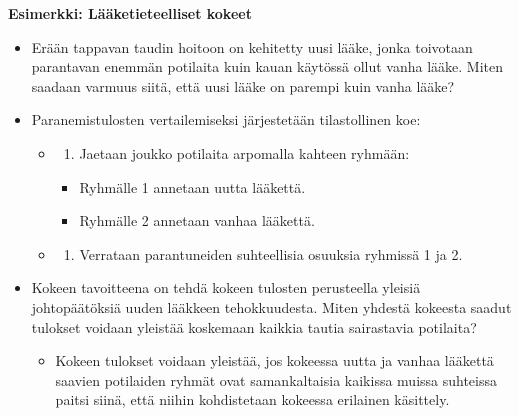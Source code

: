 \documentclass[
]{book}
\providecommand{\tightlist}{%
  \setlength{\itemsep}{0pt}\setlength{\parskip}{0pt}}
\begin{document}
\begin{eblock}{}

\textbf{Esimerkki: Lääketieteelliset kokeet}

\begin{itemize}
\tightlist
\item
  Erään tappavan taudin hoitoon on kehitetty uusi lääke, jonka toivotaan parantavan enemmän potilaita kuin kauan käytössä ollut vanha lääke. Miten saadaan varmuus siitä, että uusi lääke on parempi kuin vanha lääke?
\item
  Paranemistulosten vertailemiseksi järjestetään tilastollinen koe:

  \begin{itemize}
  \item
    \begin{enumerate}
    \def\labelenumi{(\roman{enumi})}
    \tightlist
    \item
      Jaetaan joukko potilaita arpomalla kahteen ryhmään:
    \end{enumerate}

    \begin{itemize}
    \tightlist
    \item
      Ryhmälle 1 annetaan uutta lääkettä.
    \item
      Ryhmälle 2 annetaan vanhaa lääkettä.
    \end{itemize}
  \item
    \begin{enumerate}
    \def\labelenumi{(\roman{enumi})}
    \setcounter{enumi}{1}
    \tightlist
    \item
      Verrataan parantuneiden suhteellisia osuuksia ryhmissä 1 ja 2.
    \end{enumerate}
  \end{itemize}
\item
  Kokeen tavoitteena on tehdä kokeen tulosten perusteella yleisiä johtopäätöksiä uuden lääkkeen tehokkuudesta. Miten yhdestä kokeesta saadut tulokset voidaan yleistää koskemaan kaikkia tautia sairastavia potilaita?

  \begin{itemize}
  \tightlist
  \item
    Kokeen tulokset voidaan yleistää, jos kokeessa uutta ja vanhaa lääkettä saavien potilaiden ryhmät ovat samankaltaisia kaikissa muissa suhteissa paitsi siinä, että niihin kohdistetaan kokeessa erilainen käsittely.


\end{itemize}
\end{itemize}
\end{eblock}
\end{document}
